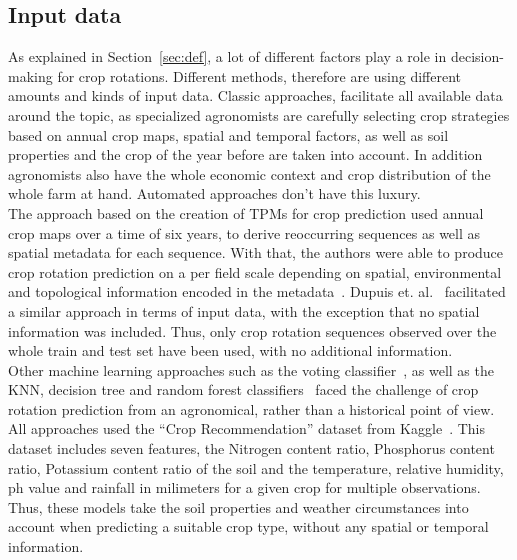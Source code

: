 \documentclass{Academic}
\begin{document}
    \subsection{Input data}
    As explained in Section~\ref{sec:def}, a lot of different factors play a role in decision-making for crop rotations. Different methods, therefore are using different amounts and kinds of input data. Classic approaches, facilitate all available data around the topic, as specialized agronomists are carefully selecting crop strategies based on annual crop maps, spatial and temporal factors, as well as soil properties and the crop of the year before are taken into account. In addition agronomists also have the whole economic context and crop distribution of the whole farm at hand. Automated approaches don't have this luxury.\\
    The approach based on the creation of TPMs for crop prediction used annual crop maps over a time of six years, to derive reoccurring sequences as well as spatial metadata for each sequence. With that, the authors were able to produce crop rotation prediction on a per field scale depending on spatial, environmental and topological information encoded in the metadata~\cite{upcott_new_2023}. Dupuis et. al.~\cite{dupuis_methodology_2023} facilitated a similar approach in terms of input data, with the exception that no spatial information was included. Thus, only crop rotation sequences observed over the whole train and test set have been used, with no additional information.\\
    Other machine learning approaches such as the voting classifier~\cite{pragathi_crop_nodate}, as well as the KNN, decision tree and random forest classifiers~\cite{rao_crop_2022} faced the challenge of crop rotation prediction from an agronomical, rather than a historical point of view. All approaches used the \enquote{Crop Recommendation} dataset from Kaggle~\cite{rao_crop_2022}. This dataset includes seven features, the Nitrogen content ratio, Phosphorus content ratio, Potassium content ratio of the soil and the temperature, relative humidity, ph value and rainfall in milimeters for a given crop for multiple observations. Thus, these models take the soil properties and weather circumstances into account when predicting a suitable crop type, without any spatial or temporal information.
\end{document}
